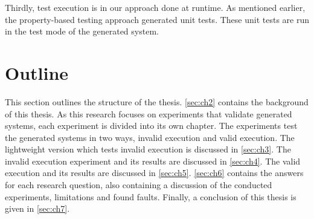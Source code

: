 Thirdly, test execution is in our approach done at runtime.
As mentioned earlier, the property-based testing approach generated unit tests.
These unit tests are run in the test mode of the generated system.

\section{Outline}
This section outlines the structure of the thesis. \autoref{sec:ch2} contains
the background of this thesis. As this research focuses on experiments that
validate generated systems, each experiment is divided into its own chapter.
The experiments test the generated systems in two ways, invalid execution and
valid execution. The lightweight version which tests invalid execution is
discussed in \autoref{sec:ch3}. The invalid execution experiment and its results
are discussed in \autoref{sec:ch4}. The valid execution and its results are
discussed in \autoref{sec:ch5}. \autoref{sec:ch6} contains the answers for each
research question, also containing a discussion of the conducted experiments,
limitations and found faults. Finally, a conclusion of this thesis is given in
\autoref{sec:ch7}.
